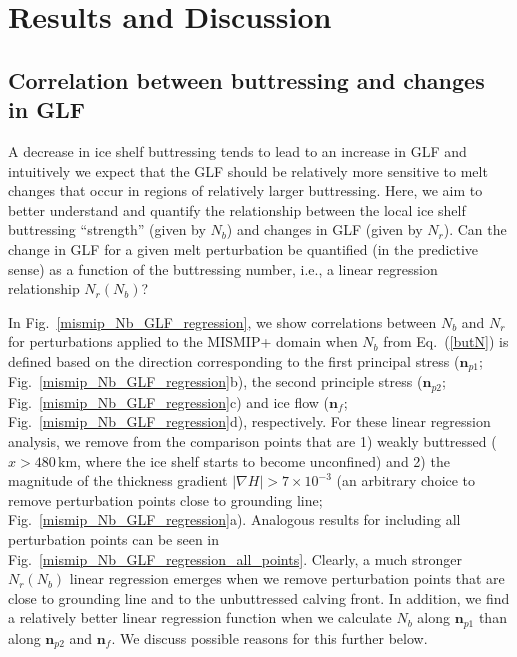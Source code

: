 \documentclass[tc, manuscript]{copernicus}
\begin{document}
\section{Results and Discussion}

\subsection{Correlation between buttressing and changes in GLF}

A decrease in ice shelf buttressing tends to lead to an increase in GLF \citep[e.g.,][]{gagliardini2010} and intuitively we expect that the GLF should be relatively more sensitive to melt changes that occur in regions of relatively larger buttressing. Here, we aim to better understand and quantify the relationship between the local ice shelf buttressing ``strength'' (given by $N_b$) and changes in GLF (given by $N_r$). Can the change in GLF for a given melt perturbation be quantified (in the predictive sense) as a function of the buttressing number, i.e., a linear regression relationship $N_r\left(N_b\right)$?

In Fig.~\ref{mismip_Nb_GLF_regression}, we show correlations between $N_b$ and $N_r$ for perturbations applied to the MISMIP+ domain when $N_b$ from Eq.~(\ref{butN}) is defined based on the direction corresponding to the first principal stress ($\mathbf{n}_{p1}$; Fig.~\ref{mismip_Nb_GLF_regression}b), the second principle stress ($\mathbf{n}_{p2}$; Fig.~\ref{mismip_Nb_GLF_regression}c) and ice flow ($\mathbf{n}_{f}$; Fig.~\ref{mismip_Nb_GLF_regression}d), respectively. For these linear regression analysis, we remove from the comparison points that are 1) weakly buttressed ($x>480$\,km, where the ice shelf starts to become unconfined) and 2) the magnitude of the thickness gradient $\left|\nabla H\right|>7\times 10^{-3}$ (an arbitrary choice to remove perturbation points close to grounding line; Fig.~\ref{mismip_Nb_GLF_regression}a). Analogous results for including all perturbation points can be seen in Fig.~\ref{mismip_Nb_GLF_regression_all_points}. Clearly, a much stronger $N_r\left(N_b\right)$ linear regression emerges when we remove perturbation points that are close to grounding line and to the unbuttressed calving front. In addition, we find a relatively better linear regression function when we calculate $N_b$ along $\mathbf{n}_{p1}$ than along $\mathbf{n}_{p2}$ and $\mathbf{n}_{f}$. We discuss possible reasons for this further below.
\end{document}
